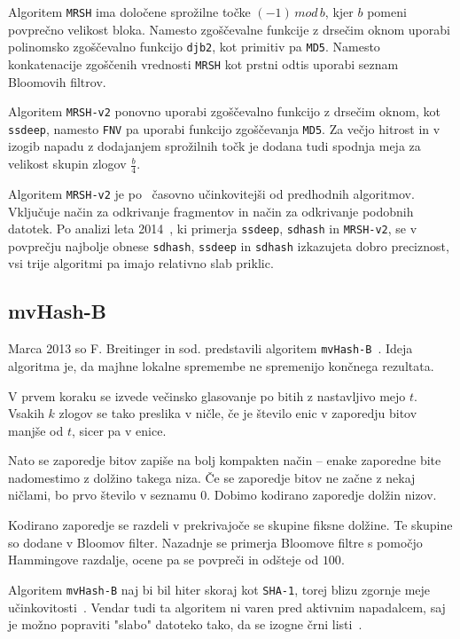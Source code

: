 \documentclass{acm_proc_article-sp}
\begin{document}
Algoritem \texttt{MRSH} ima določene sprožilne točke $(-1)\,mod\,b$, kjer $b$ pomeni povprečno velikost bloka. Namesto zgoščevalne funkcije z drsečim oknom uporabi polinomsko zgoščevalno funkcijo \texttt{djb2}, kot primitiv pa \texttt{MD5}. Namesto konkatenacije zgoščenih vrednosti \texttt{MRSH} kot prstni odtis uporabi seznam Bloomovih filtrov. 

Algoritem \texttt{MRSH-v2} ponovno uporabi zgoščevalno funkcijo z drsečim oknom, kot \texttt{ssdeep}, namesto \texttt{FNV} pa uporabi funkcijo zgoščevanja \texttt{MD5}. Za večjo hitrost in v izogib napadu z dodajanjem sprožilnih točk je dodana tudi spodnja meja za velikost skupin zlogov $\frac{b}{4}$. 

Algoritem \texttt{MRSH-v2} je po~\cite{mrsh-v2} časovno učinkovitejši od predhodnih algoritmov. Vključuje način za odkrivanje fragmentov in način za odkrivanje podobnih datotek. Po analizi leta 2014~\cite{breitinger2014}, ki primerja \texttt{ssdeep}, \texttt{sdhash} in \texttt{MRSH-v2}, se v povprečju najbolje obnese \texttt{sdhash}, \texttt{ssdeep} in \texttt{sdhash} izkazujeta dobro preciznost, vsi trije algoritmi pa imajo relativno slab priklic.

\subsection{mvHash-B}
Marca 2013 so F. Breitinger in sod. predstavili algoritem \texttt{mvHash-B}~\cite{mvhash-b}. Ideja algoritma je, da majhne lokalne spremembe ne spremenijo končnega rezultata. 

V prvem koraku se izvede večinsko glasovanje po bitih z nastavljivo mejo $t$. Vsakih $k$ zlogov se tako preslika v ničle, če je število enic v zaporedju bitov manjše od $t$, sicer pa v enice.

Nato se zaporedje bitov zapiše na bolj kompakten način -- enake zaporedne bite nadomestimo z dolžino takega niza. Če se zaporedje bitov ne začne z nekaj ničlami, bo prvo število v seznamu 0. Dobimo kodirano zaporedje dolžin nizov.

Kodirano zaporedje se razdeli v prekrivajoče se skupine fiksne dolžine. Te skupine so dodane v Bloomov filter.
Nazadnje se primerja Bloomove filtre s pomočjo Hammingove razdalje, ocene pa se povpreči in odšteje od $100$. 

Algoritem \texttt{mvHash-B} naj bi bil hiter skoraj kot \texttt{SHA-1}, torej blizu zgornje meje učinkovitosti~\cite{mvhash-b}. Vendar tudi ta algoritem ni varen pred aktivnim napadalcem, saj je možno popraviti "slabo" datoteko tako, da se izogne črni listi~\cite{chang2016security}.
\end{document}

